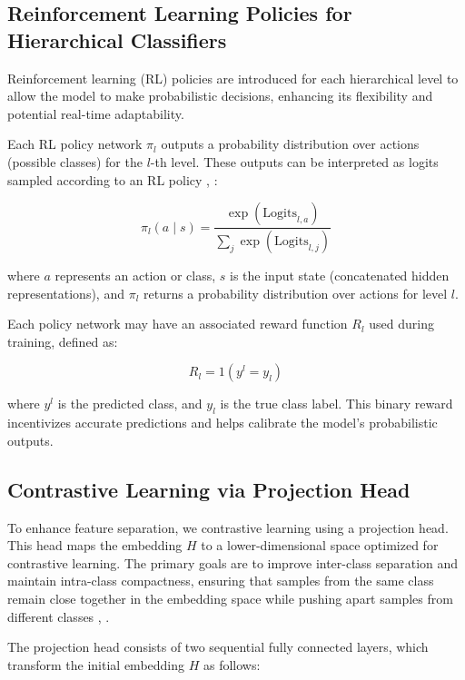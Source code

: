 \documentclass[9pt,a4paper,twoside]{rho-class/rho}
\begin{document}
    \subsection{Reinforcement Learning Policies for Hierarchical Classifiers}

Reinforcement learning (RL) policies are introduced for each hierarchical level to allow the model to make probabilistic decisions, enhancing its flexibility and potential real-time adaptability.

Each RL policy network \( \pi_l \) outputs a probability distribution over actions (possible classes) for the \( l \)-th level. These outputs can be interpreted as logits sampled according to an RL policy \cite{barto2021reinforcement}, \cite{mohammed2018effectiveness}:

\[ \label{eq:policy_output}
\pi_l(a \mid s) = \frac{\exp(\text{Logits}_{l,a})}{\sum_{j} \exp(\text{Logits}_{l,j})}
\]

where \( a \) represents an action or class, \( s \) is the input state (concatenated hidden representations), and \( \pi_l \) returns a probability distribution over actions for level \( l \).

Each policy network may have an associated reward function \( R_l \) used during training, defined as:

\[ \label{eq:reward_function}
R_l = 1(y^l = y_l)
\]

where \( y^l \) is the predicted class, and \( y_l \) is the true class label. This binary reward incentivizes accurate predictions and helps calibrate the model’s probabilistic outputs.

\subsection{Contrastive Learning via Projection Head}

To enhance feature separation, we contrastive learning using a projection head. This head maps the embedding \( H \) to a lower-dimensional space optimized for contrastive learning. The primary goals are to improve inter-class separation and maintain intra-class compactness, ensuring that samples from the same class remain close together in the embedding space while pushing apart samples from different classes \cite{liu2021self}, \cite{kim2020adversarial}.

The projection head consists of two sequential fully connected layers, which transform the initial embedding \( H \) as follows:
\end{document}
